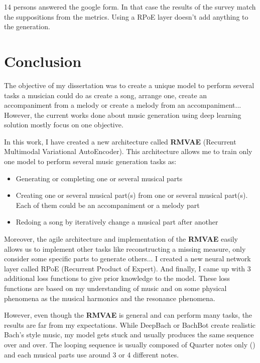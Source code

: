 \documentclass[12pt]{report}
\begin{document}
14 persons answered the google form.
In that case the results of the survey match the suppositions from the metrics.
Using a RPoE layer doesn't add anything to the generation.




\chapter{Conclusion}

The objective of my dissertation was to create a unique model to perform several tasks a musician could do as create a song, arrange one, create an accompaniment from a melody or create a melody from an accompaniment... 
However, the current works done about music generation using deep learning solution mostly focus on one objective.

In this work, I have created a new architecture called \textbf{RMVAE} (Recurrent Multimodal Variational AutoEncoder).
This architecture allows me to train only one model to perform several music generation tasks as:
\begin{itemize}
    \item Generating or completing one or several musical parts
    \item Creating one or several musical part(s) from one or several musical part(s).
    Each of them could be an accompaniment or a melody part
    \item Redoing a song by iteratively change a musical part after another
\end{itemize}
Moreover, the agile architecture and implementation of the \textbf{RMVAE} easily allows us to implement other tasks like reconstructing a missing measure, only consider some specific parts to generate others...
I created a new neural network layer called RPoE (Recurrent Product of Expert).
And finally, I came up with 3 additional loss functions to give prior knowledge to the model.
These loss functions are based on my understanding of music and on some physical phenomena as the musical harmonics and the resonance phenomena.

However, even though the \textbf{RMVAE} is general and can perform many tasks, the results are far from my expectations.
While DeepBach \cite{hadjeres_deepbach:_2016} or BachBot \cite{liang_automatic_2017} create realistic Bach's style music, my model gets stuck and usually produces the same sequence over and over.
The looping sequence is usually composed of Quarter notes only (\musQuarter) and each musical parts use around 3 or 4 different notes.
\end{document}
